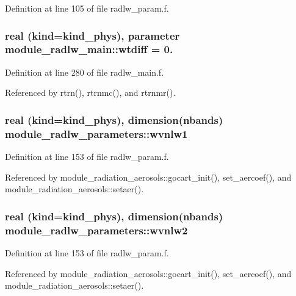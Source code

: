 Definition at line 105 of file radlw\+\_\+param.\+f.

\subsubsection[{\texorpdfstring{wtdiff}{wtdiff}}]{\setlength{\rightskip}{0pt plus 5cm}real (kind=kind\+\_\+phys), parameter module\+\_\+radlw\+\_\+main\+::wtdiff = 0.\hspace{0.3cm}{\ttfamily [private]}}\hypertarget{group__module__radlw__main_gaf1a0ca36bfce779493a7d1a4b81f6f73}{}\label{group__module__radlw__main_gaf1a0ca36bfce779493a7d1a4b81f6f73}


Definition at line 280 of file radlw\+\_\+main.\+f.



Referenced by rtrn(), rtrnmc(), and rtrnmr().

\subsubsection[{\texorpdfstring{wvnlw1}{wvnlw1}}]{\setlength{\rightskip}{0pt plus 5cm}real (kind=kind\+\_\+phys), dimension(nbands) module\+\_\+radlw\+\_\+parameters\+::wvnlw1}\hypertarget{group__module__radlw__main_ga3a7370a94889d0cbaf6057404830d978}{}\label{group__module__radlw__main_ga3a7370a94889d0cbaf6057404830d978}


Definition at line 153 of file radlw\+\_\+param.\+f.



Referenced by module\+\_\+radiation\+\_\+aerosols\+::gocart\+\_\+init(), set\+\_\+aercoef(), and module\+\_\+radiation\+\_\+aerosols\+::setaer().

\subsubsection[{\texorpdfstring{wvnlw2}{wvnlw2}}]{\setlength{\rightskip}{0pt plus 5cm}real (kind=kind\+\_\+phys), dimension(nbands) module\+\_\+radlw\+\_\+parameters\+::wvnlw2}\hypertarget{group__module__radlw__main_gace30abd03d144096ee6b444b46081b58}{}\label{group__module__radlw__main_gace30abd03d144096ee6b444b46081b58}


Definition at line 153 of file radlw\+\_\+param.\+f.



Referenced by module\+\_\+radiation\+\_\+aerosols\+::gocart\+\_\+init(), set\+\_\+aercoef(), and module\+\_\+radiation\+\_\+aerosols\+::setaer().

